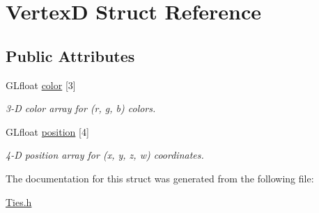 \hypertarget{struct_vertex_d}{}\section{VertexD Struct Reference}
\label{struct_vertex_d}
\subsection*{Public Attributes}
\begin{DoxyCompactItemize}
\item 
\mbox{\label{struct_vertex_d_a30b72fe9fbe53e2a30229355b78b781d}} 
G\+Lfloat \hyperlink{struct_vertex_d_a30b72fe9fbe53e2a30229355b78b781d}{color} \mbox{[}3\mbox{]}
\begin{DoxyCompactList}\small\item\em 3-\/D color array for (r, g, b) colors. \end{DoxyCompactList}\item 
\mbox{\label{struct_vertex_d_aecf1b0742ee4049ae1f8a77be698e985}} 
G\+Lfloat \hyperlink{struct_vertex_d_aecf1b0742ee4049ae1f8a77be698e985}{position} \mbox{[}4\mbox{]}
\begin{DoxyCompactList}\small\item\em 4-\/D position array for (x, y, z, w) coordinates. \end{DoxyCompactList}\end{DoxyCompactItemize}


The documentation for this struct was generated from the following file\+:\begin{DoxyCompactItemize}
\item 
\hyperlink{_ties_8h}{Ties.\+h}\end{DoxyCompactItemize}
